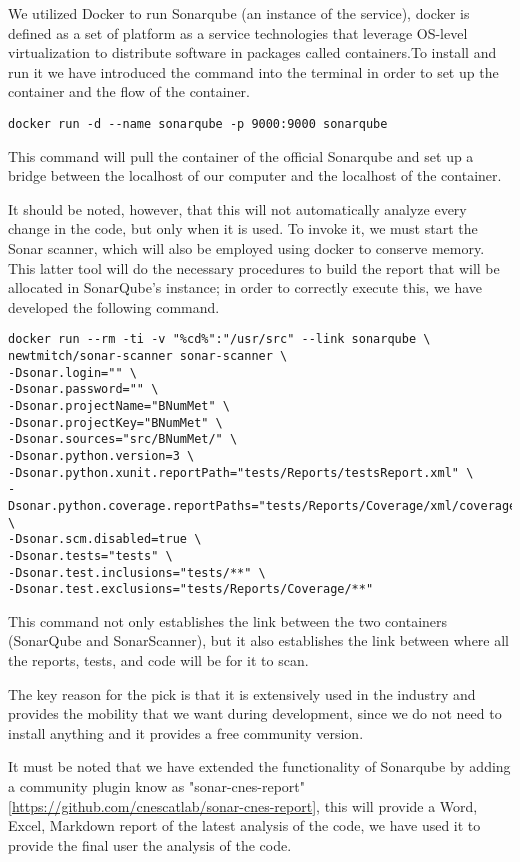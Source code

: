 We utilized Docker to run Sonarqube (an instance of the service), docker is defined as a set of platform as a service technologies that leverage OS-level virtualization to distribute software in packages called containers\cite{enwiki:1148220158}.To install and run it we have introduced the command into the terminal in order to set up the container and the flow of the container.

\begin{lstlisting}
docker run -d --name sonarqube -p 9000:9000 sonarqube
\end{lstlisting}

This command will pull the container of the official Sonarqube and set up a bridge between the localhost of our computer and the localhost of the container.

It should be noted, however, that this will not automatically analyze every change in the code, but only when it is used. To invoke it, we must start the Sonar scanner, which will also be employed using docker to conserve memory. This latter tool will do the necessary procedures to build the report that will be allocated in SonarQube's instance; in order to correctly execute this, we have developed the following command.

\begin{lstlisting}
docker run --rm -ti -v "%cd%":"/usr/src" --link sonarqube \
newtmitch/sonar-scanner sonar-scanner \
-Dsonar.login="" \
-Dsonar.password="" \
-Dsonar.projectName="BNumMet" \
-Dsonar.projectKey="BNumMet" \
-Dsonar.sources="src/BNumMet/" \
-Dsonar.python.version=3 \
-Dsonar.python.xunit.reportPath="tests/Reports/testsReport.xml" \
-Dsonar.python.coverage.reportPaths="tests/Reports/Coverage/xml/coverage.xml" \
-Dsonar.scm.disabled=true \
-Dsonar.tests="tests" \
-Dsonar.test.inclusions="tests/**" \
-Dsonar.test.exclusions="tests/Reports/Coverage/**"
\end{lstlisting}

This command not only establishes the link between the two containers (SonarQube and SonarScanner), but it also establishes the link between where all the reports, tests, and code will be for it to scan.

The key reason for the pick is that it is extensively used in the industry and provides the mobility that we want during development, since we do not need to install anything and it provides a free community version.

It must be noted that we have extended the functionality of Sonarqube by adding a community plugin know as "sonar-cnes-report" [\href{https://github.com/cnescatlab/sonar-cnes-report}{https://github.com/cnescatlab/sonar-cnes-report}], this will provide a Word, Excel, Markdown report of the latest analysis of the code, we have used it to provide the final user the analysis of the code.